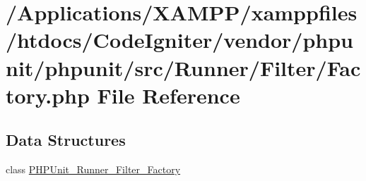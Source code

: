 \hypertarget{phpunit_2phpunit_2src_2_runner_2_filter_2_factory_8php}{}\section{/\+Applications/\+X\+A\+M\+P\+P/xamppfiles/htdocs/\+Code\+Igniter/vendor/phpunit/phpunit/src/\+Runner/\+Filter/\+Factory.php File Reference}
\label{phpunit_2phpunit_2src_2_runner_2_filter_2_factory_8php}
\subsection*{Data Structures}
\begin{DoxyCompactItemize}
\item 
class \mbox{\hyperlink{class_p_h_p_unit___runner___filter___factory}{P\+H\+P\+Unit\+\_\+\+Runner\+\_\+\+Filter\+\_\+\+Factory}}
\end{DoxyCompactItemize}
